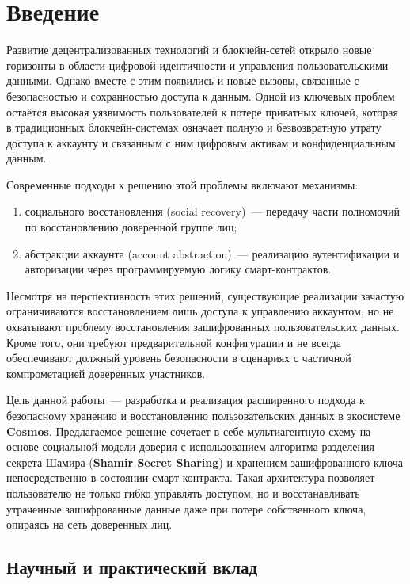 \section{Введение}

Развитие децентрализованных технологий и блокчейн-сетей открыло новые горизонты в области цифровой идентичности и управления пользовательскими данными. Однако вместе с этим появились и новые вызовы, связанные с безопасностью и сохранностью доступа к данным. Одной из ключевых проблем остаётся высокая уязвимость пользователей к потере приватных ключей, которая в традиционных блокчейн-системах означает полную и безвозвратную утрату доступа к аккаунту и связанным с ним цифровым активам и конфиденциальным данным.

Современные подходы к решению этой проблемы включают механизмы:
\begin{enumerate}
\item
социального восстановления (social recovery)~--- передачу части полномочий по восстановлению доверенной группе лиц;

\item
абстракции аккаунта (account abstraction)~--- реализацию аутентификации и авторизации через программируемую логику смарт-контрактов.
\end{enumerate}

Несмотря на перспективность этих решений, существующие реализации зачастую ограничиваются восстановлением лишь доступа к управлению аккаунтом, но не охватывают проблему восстановления зашифрованных пользовательских данных. Кроме того, они требуют предварительной конфигурации и не всегда обеспечивают должный уровень безопасности в сценариях с частичной компрометацией доверенных участников.

Цель данной работы~--- разработка и реализация расширенного подхода к безопасному хранению и восстановлению пользовательских данных в экосистеме \textbf{Cosmos}. Предлагаемое решение сочетает в себе мультиагентную схему на основе социальной модели доверия с использованием алгоритма разделения секрета Шамира (\textbf{Shamir Secret Sharing}) и хранением зашифрованного ключа непосредственно в состоянии смарт-контракта. Такая архитектура позволяет пользователю не только гибко управлять доступом, но и восстанавливать утраченные зашифрованные данные даже при потере собственного ключа, опираясь на сеть доверенных лиц.

\subsection{Научный и практический вклад}

